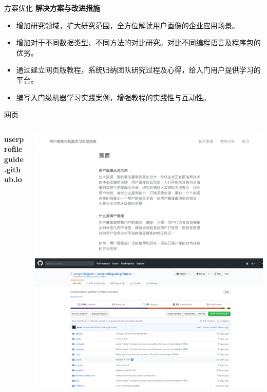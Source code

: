 \documentclass[10pt]{beamer}
\begin{document}
\begin{frame}{方案优化}
  \textbf{解决方案与改进措施}\newline
   \begin{itemize}
      \item 增加研究领域，扩大研究范围，全方位解读用户画像的企业应用场景。\newline
      \item 增加对于不同数据类型、不同方法的对比研究。对比不同编程语言及程序包的优劣。\newline
      \item 通过建立网页版教程，系统归纳团队研究过程及心得，给入门用户提供学习的平台。\newline
      \item 编写入门级机器学习实践案例，增强教程的实践性与互动性。
   \end{itemize}
\end{frame}


\begin{frame}{网页}
\begin{columns}
  \begin{column}{0.4\textwidth}
    \textbf{userprofileguide.github.io}
  \end{column}
  \begin{column}{0.6\textwidth}
    \includegraphics[height=0.4\paperheight]{website1}
    \includegraphics[height=0.4\paperheight]{website2}
  \end{column}
  \end{columns}
\end{frame}
\end{document}
